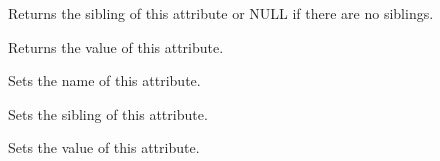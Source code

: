 
Returns the sibling of this attribute or NULL if there are no siblings.

\label{wxxmlattributegetvalue}


Returns the value of this attribute.

\label{wxxmlattributesetname}


Sets the name of this attribute.

\label{wxxmlattributesetnext}


Sets the sibling of this attribute.

\label{wxxmlattributesetvalue}


Sets the value of this attribute.


